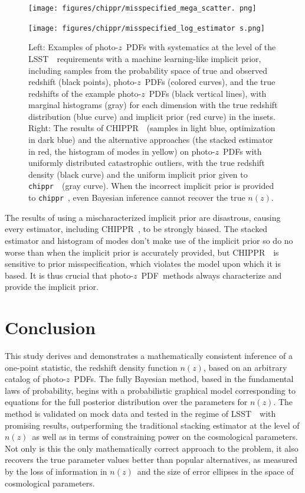 \documentclass[iop]{emulateapj}
\newcommand{\project}[1]{{\textsc{#1}}~}
\newcommand{\lsst}{\project{LSST}}
\newcommand{\Chippr}{\project{CHIPPR}}
\newcommand{\repo}[1]{{\texttt{#1}}~}
\newcommand{\chippr}{\repo{chippr}}
\newcommand{\nz}{$n(z)$}
\newcommand{\pz}{photo-$z$~}
\newcommand{\pzpdf}{\pz PDF}
\begin{document}
\begin{figure}
	\begin{center}
		
\texttt{[image: figures/chippr/misspecified\_mega\_scatter.
png]}
		
\texttt{[image: figures/chippr/misspecified\_log\_estimator
s.png]}
		\caption{
			Left: Examples of \pzpdf s with systematics at the 
level of the \lsst\ requirements with a machine learning-like implicit prior, 
including samples from the probability space of true and observed redshift 
(black points), \pzpdf s (colored curves), and the true redshifts of the 
example \pzpdf s (black vertical lines), with marginal histograms (gray) for 
each dimension with the true redshift distribution (blue curve) and implicit 
prior (red curve) in the insets.
			Right: The results of \Chippr\ (samples in light blue, 
optimization in dark blue) and the alternative approaches (the stacked 
estimator in red, the histogram of modes in yellow) on \pzpdf s with uniformly 
distributed catastrophic outliers, with the true redshift density (black curve) 
and the uniform implicit prior given to \chippr\ (gray curve).
			When the incorrect implicit prior is provided to 
\chippr, even Bayesian inference cannot recover the true \nz.
		}
		\label{fig:mischaracterized}
	\end{center}
\end{figure}

The results of using a mischaracterized implicit prior are disastrous, causing 
every estimator, including \Chippr, to be strongly biased.
The stacked estimator and histogram of modes don't make use of the implicit 
prior so do no worse than when the implicit prior is accurately provided, but 
\Chippr\ is sensitive to prior misspecification, which violates the model upon 
which it is based.
It is thus crucial that \pzpdf\ methods always characterize and provide the 
implicit prior.


\section{Conclusion}
\label{sec:con}

This study derives and demonstrates a mathematically consistent inference of a 
one-point statistic, the redshift density function \nz, based on an arbitrary 
catalog of \pzpdf s.  
The fully Bayesian method, based in the fundamental laws of probability, begins 
with a probabilistic graphical model corresponding to equations for the full 
posterior distribution over the parameters for \nz.  
The method is validated on mock data and tested in the regime of \lsst\ with 
promising results, outperforming the traditional stacking estimator at the 
level of \nz\ as well as in terms of constraining power on the cosmological 
parameters.
Not only is this the only mathematically correct approach to the problem, it 
also recovers the true parameter values better than popular alternatives, as 
measured by the loss of information in \nz\ and the size of error ellipses in 
the space of cosmological parameters.
\end{document}
